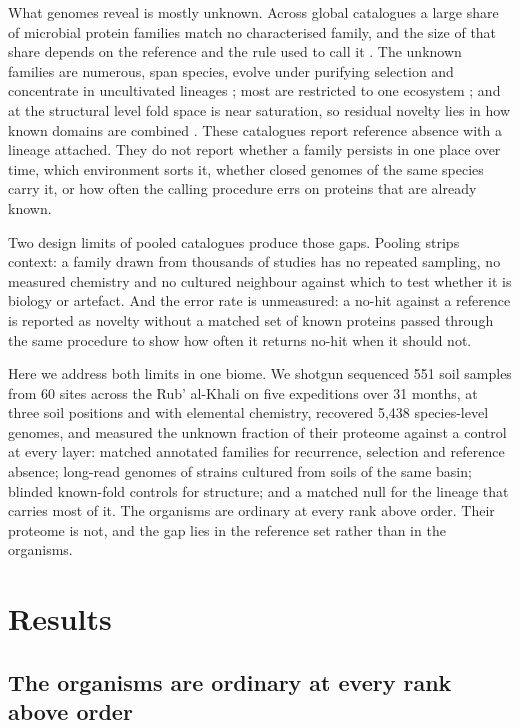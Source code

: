 \documentclass[11pt]{article}
\begin{document}
What genomes reveal is mostly unknown. Across global catalogues a large share of microbial protein
families match no characterised family, and the size of that share depends on the reference and
the rule used to call it \citep{pavlopoulos2023darkmatter,vanni2022agnostos,coelho2022gmgc}. The
unknown families are numerous, span species, evolve under purifying selection and concentrate in
uncultivated lineages \citep{rodriguezdelrio2024fesnov}; most are restricted to one ecosystem
\citep{aplakidou2025quadrupling}; and at the structural level fold space is near saturation, so
residual novelty lies in how known domains are combined \citep{lau2024ted,yeo2025afesm}. These
catalogues report reference absence with a lineage attached. They do not report whether a family
persists in one place over time, which environment sorts it, whether closed genomes of the same
species carry it, or how often the calling procedure errs on proteins that are already known.

Two design limits of pooled catalogues produce those gaps. Pooling strips context: a family drawn
from thousands of studies has no repeated sampling, no measured chemistry and no cultured neighbour
against which to test whether it is biology or artefact. And the error rate is unmeasured: a no-hit
against a reference is reported as novelty without a matched set of known proteins passed through
the same procedure to show how often it returns no-hit when it should not.

Here we address both limits in one biome. We shotgun sequenced 551 soil samples from 60 sites across
the Rub' al-Khali on five expeditions over 31 months, at three soil positions and with elemental
chemistry, recovered 5{,}438 species-level genomes, and measured the unknown fraction of their
proteome against a control at every layer: matched annotated families for recurrence, selection and
reference absence; long-read genomes of strains cultured from soils of the same basin; blinded
known-fold controls for structure; and a matched null for the lineage that carries most of it. The
organisms are ordinary at every rank above order. Their proteome is not, and the gap lies in the
reference set rather than in the organisms.

\section*{Results}

\subsection*{The organisms are ordinary at every rank above order}
\end{document}
